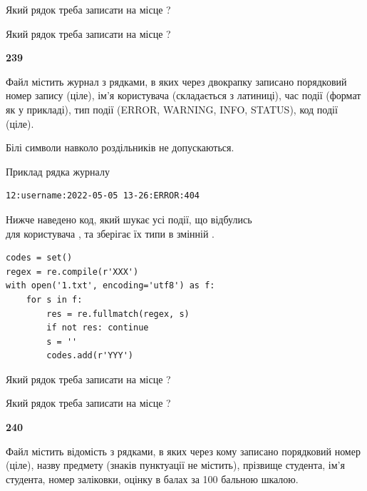 Який рядок треба записати на місце  ?\par
\vspace{5mm}


Який рядок треба записати на місце  ?\par


\newpage

{\begin {center}\textbf{ 239}\end {center}}\par
Файл  містить журнал з рядками, в яких через двокрапку записано поряд\-ко\-вий номер запису (ціле), ім'я користувача (складається з латиниці), час події (фор\-мат як у прикладі), тип події (ERROR, WARNING, INFO, STATUS), код події (ціле).

Білі символи навколо роздільників не допускаються.

Приклад рядка журналу



\begin{verbatim}
12:username:2022-05-05 13-26:ERROR:404
\end{verbatim}


Нижче наведено код, який шукає усі події, що відбулись\\ для користувача , та зберігає їх типи в змінній .



\begin{verbatim}
codes = set()
regex = re.compile(r'XXX')
with open('1.txt', encoding='utf8') as f:
    for s in f:
        res = re.fullmatch(regex, s)
        if not res: continue
        s = ''
        codes.add(r'YYY')
\end{verbatim}





Який рядок треба записати на місце  ?\par
\vspace{5mm}


Який рядок треба записати на місце  ?\par


\newpage

{\begin {center}\textbf{ 240}\end {center}}\par
Файл  містить відомість з рядками, в яких через кому записано поряд\-ковий номер (ціле), назву предмету (знаків пунктуації не містить), прізвище студента, ім'я студента, номер заліковки, оцінку в балах за 100 бальною шкалою.

